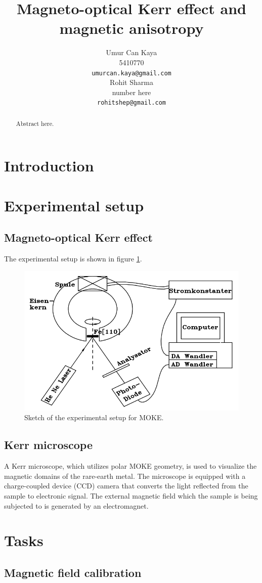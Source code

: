 \documentclass{article}
\title{Magneto-optical Kerr effect and magnetic anisotropy}
\author{
Umur Can Kaya\\
5410770\\
\texttt{umurcan.kaya@gmail.com}\\
\And
Rohit Sharma\\
number here\\
\texttt{rohitshep@gmail.com}\\
}
\begin{document}
\maketitle

\begin{abstract}
Abstract here.
\end{abstract}

\section{Introduction}
\clearpage
\section{Experimental setup}
\subsection{Magneto-optical Kerr effect}
The experimental setup is shown in figure \ref{fig:exp_setup}.
\begin{figure}[h!]
\centering
\includegraphics[width=0.6\linewidth]{LAB/MOKE/experimental_setup.PNG}
\caption{Sketch of the experimental setup for MOKE.}
\label{fig:exp_setup}
\end{figure}
\subsection{Kerr microscope}
A Kerr microscope, which utilizes polar MOKE geometry, is used to visualize the magnetic domains of the rare-earth metal. The microscope is equipped with a charge-coupled device (CCD) camera that converts the light reflected from the sample to electronic signal. The external magnetic field which the sample is being subjected to is generated by an electromagnet.
\section{Tasks}
\subsection{Magnetic field calibration}
\end{document}
